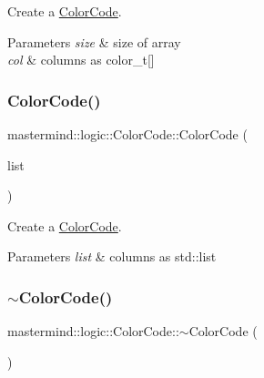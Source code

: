 Create a \hyperlink{classmastermind_1_1logic_1_1_color_code}{Color\+Code}. 


\begin{DoxyParams}{Parameters}
{\em size} & size of array \\
\hline
{\em col} & columns as color\+\_\+t\mbox{[}\mbox{]} \\
\hline
\end{DoxyParams}
\hypertarget{classmastermind_1_1logic_1_1_color_code_ae407455b2aa672f8183cad6ec76bc848}{}\label{classmastermind_1_1logic_1_1_color_code_ae407455b2aa672f8183cad6ec76bc848} 
\subsubsection{\texorpdfstring{Color\+Code()}{ColorCode()}\hspace{0.1cm}{\footnotesize\ttfamily [3/3]}}
{\footnotesize\ttfamily mastermind\+::logic\+::\+Color\+Code\+::\+Color\+Code (\begin{DoxyParamCaption}\item[{std\+::list$<$ \hyperlink{namespacemastermind_1_1logic_aab4e2166db8e8e5dcbed785c7927eca1}{color\+\_\+t} $\ast$$>$ \&}]{list }\end{DoxyParamCaption})}



Create a \hyperlink{classmastermind_1_1logic_1_1_color_code}{Color\+Code}. 


\begin{DoxyParams}{Parameters}
{\em list} & columns as std\+::list \\
\hline
\end{DoxyParams}
\hypertarget{classmastermind_1_1logic_1_1_color_code_aee5e4a3d13fd9e2e2c69964fdffe04cf}{}\label{classmastermind_1_1logic_1_1_color_code_aee5e4a3d13fd9e2e2c69964fdffe04cf} 
\subsubsection{\texorpdfstring{$\sim$\+Color\+Code()}{~ColorCode()}}
{\footnotesize\ttfamily mastermind\+::logic\+::\+Color\+Code\+::$\sim$\+Color\+Code (\begin{DoxyParamCaption}{ }\end{DoxyParamCaption})\hspace{0.3cm}{\ttfamily [virtual]}}



